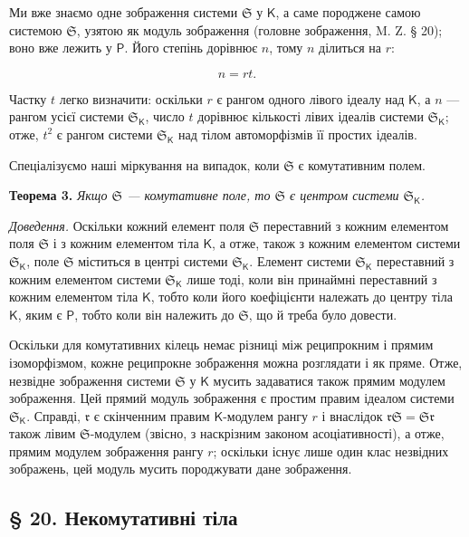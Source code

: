 \documentclass[11pt]{article}
\begin{document}
Ми вже знаємо одне зображення системи \(\mathfrak S\) у \(\mathsf K\), а саме породжене самою системою \(\mathfrak S\), узятою як модуль зображення (головне зображення, M. Z. § 20); воно вже лежить у \(\mathsf P\). Його степінь дорівнює \(n\), тому \(n\) ділиться на \(r\):

\[
n=rt.
\]

Частку \(t\) легко визначити: оскільки \(r\) є рангом одного лівого ідеалу над \(\mathsf K\), а \(n\) --- рангом усієї системи \(\mathfrak S_{\mathsf K}\), число \(t\) дорівнює кількості лівих ідеалів системи \(\mathfrak S_{\mathsf K}\); отже, \(t^2\) є рангом системи \(\mathfrak S_{\mathsf K}\) над тілом автоморфізмів її простих ідеалів.

Спеціалізуємо наші міркування на випадок, коли \(\mathfrak S\) є комутативним полем.

\textbf{Теорема 3.} \emph{Якщо \(\mathfrak S\) --- комутативне поле, то \(\mathfrak S\) є центром системи \(\mathfrak S_{\mathsf K}\).}

\emph{Доведення.} Оскільки кожний елемент поля \(\mathfrak S\) переставний з кожним елементом поля \(\mathfrak S\) і з кожним елементом тіла \(\mathsf K\), а отже, також з кожним елементом системи \(\mathfrak S_{\mathsf K}\), поле \(\mathfrak S\) міститься в центрі системи \(\mathfrak S_{\mathsf K}\). Елемент системи \(\mathfrak S_{\mathsf K}\) переставний з кожним елементом системи \(\mathfrak S_{\mathsf K}\) лише тоді, коли він принаймні переставний з кожним елементом тіла \(\mathsf K\), тобто коли його коефіцієнти належать до центру тіла \(\mathsf K\), яким є \(\mathsf P\), тобто коли він належить до \(\mathfrak S\), що й треба було довести.

Оскільки для комутативних кілець немає різниці між реципрокним і прямим ізоморфізмом, кожне реципрокне зображення можна розглядати і як пряме. Отже, незвідне зображення системи \(\mathfrak S\) у \(\mathsf K\) мусить задаватися також прямим модулем зображення. Цей прямий модуль зображення є простим правим ідеалом системи \(\mathfrak S_{\mathsf K}\). Справді, \(\mathfrak r\) є скінченним правим \(\mathsf K\)-модулем рангу \(r\) і внаслідок \(\mathfrak r\mathfrak S=\mathfrak S\mathfrak r\) також лівим \(\mathfrak S\)-модулем (звісно, з наскрізним законом асоціативності), а отже, прямим модулем зображення рангу \(r\); оскільки існує лише один клас незвідних зображень, цей модуль мусить породжувати дане зображення.

\subsection*{§ 20. Некомутативні тіла}\label{nichtkommutative-koerper}
\end{document}
